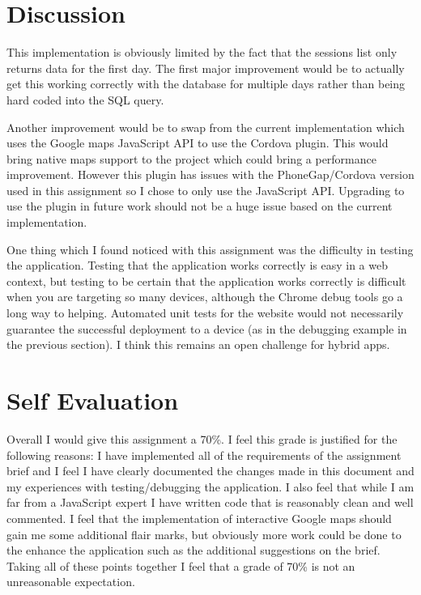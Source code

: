 \documentclass[paper=a4, fontsize=11pt]{scrartcl}	%
\numberwithin{equation}{section}															%
\numberwithin{figure}{section}																%
\numberwithin{table}{section}
\begin{document}
\section{Discussion}
\label{sec:discussion}
This implementation is obviously limited by the fact that the sessions list only returns data for the first day. The first major improvement would be to actually get this working correctly with the database for multiple days rather than being hard coded into the SQL query. 

Another improvement would be to swap from the current implementation which uses the Google maps JavaScript API to use the Cordova  plugin. This would bring native maps support to the project which could bring a performance improvement. However this plugin has issues with the PhoneGap/Cordova version used in this assignment so I chose to only use the JavaScript API. Upgrading to use the plugin in future work should not be a huge issue based on the current implementation.

One thing which I found noticed with this assignment was the difficulty in testing the application. Testing that the application works correctly is easy in a web context, but testing to be certain that the application works correctly is difficult when you are targeting so many devices, although the Chrome debug tools go a long way to helping. Automated unit tests for the website would not necessarily guarantee the successful deployment to a device (as in the debugging example in the previous section). I think this remains an open challenge for hybrid apps.

\section{Self Evaluation}
Overall I would give this assignment a 70\%. I feel this grade is justified for the following reasons: I have implemented all of the requirements of the assignment brief and I feel I have clearly documented the changes made in this document and my experiences with testing/debugging the application. I also feel that while I am far from a JavaScript expert I have written code that is reasonably clean and well commented. I feel that the implementation of interactive Google maps should gain me some additional flair marks, but obviously more work could be done to the enhance the application such as the additional suggestions on the brief. Taking all of these points together I feel that a grade of 70\% is not an unreasonable expectation.


\clearpage


\end{document}
